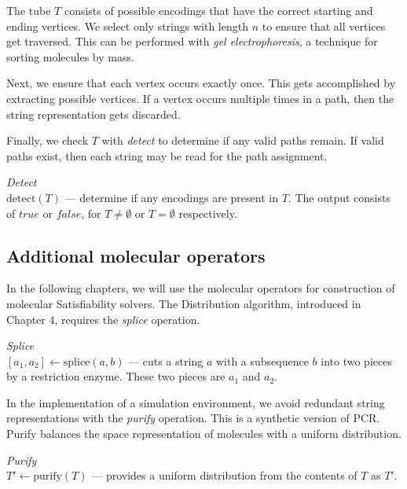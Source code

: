 The tube $T$ consists of possible encodings that have the correct starting and ending vertices. We select only strings with length $n$ to ensure that all vertices get traversed.  This can be performed with \textit{gel electrophoresis}, a technique for sorting molecules by mass.

Next, we ensure that each vertex occurs exactly once.  This gets accomplished by extracting possible vertices.  If a vertex occurs multiple times in a path, then the string representation gets discarded.

Finally, we check $T$ with \textit{detect} to determine if any valid paths remain.  If valid paths exist, then each string may be read for the path assignment.

\begin{definition}
\textit{Detect}\\
$ \text{detect}( T)$ --- determine if any encodings are present in $T$.  The output consists of $true$ or $false$, for $T \neq \emptyset$ or $T = \emptyset$ respectively.
\end{definition}

\subsection{Additional molecular operators}

In the following chapters, we will use the molecular operators for construction of molecular {\sc Satisfiability} solvers.  The Distribution algorithm, introduced in Chapter 4, requires the \textit{splice} operation.
\begin{definition}
\textit{Splice}\\
$[a_1, a_2] \leftarrow \text{splice}(a, b)$ --- cuts a string $a$ with a subsequence $b$ into two pieces by a restriction enzyme.  These two pieces are $a_1$ and $a_2$.
\end{definition}

In the implementation of a simulation environment, we avoid redundant string representations with the \textit{purify} operation.  This is a synthetic version of PCR.  Purify balances the space representation of molecules with a uniform distribution.
\begin{definition}
\textit{Purify}\\
$T' \leftarrow \text{purify}(T)$ --- provides a uniform distribution from the contents of $T$ as $T'$.
\end{definition}


